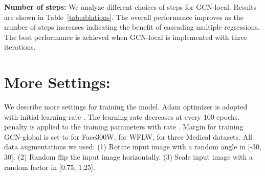 \documentclass[runningheads]{llncs}
\begin{document}
\textbf{Number of steps:} We analyze different choices of steps for GCN-local. Results are shown in Table~\ref{tab:ablations}. The overall performance improves as the number of steps increases indicating the benefit of cascading multiple regressions. The best performance is achieved when GCN-local is implemented with three iterations. 

\section{More Settings:}
We describe more settings for training the model. Adam optimizer is adopted with initial learning rate . The learning rate decreases at every 100 epochs.  penalty is applied to the training parameters with rate . Margin for training GCN-global is set to  for Face300W,  for WFLW,  for three Medical datasets. All data augmentations we used: (1) Rotate input image with a random angle in [-30, 30]. (2) Random flip the input image horizontally. (3) Scale input image with a random factor in [0.75, 1.25].



\clearpage


\end{document}

